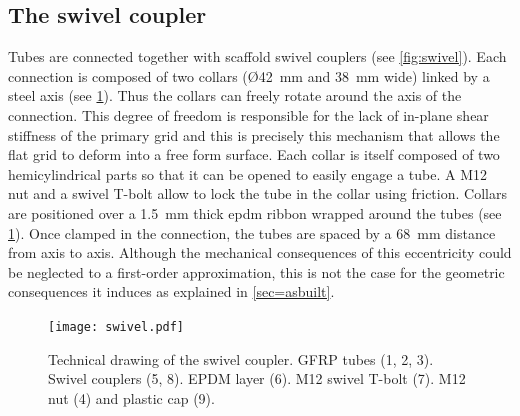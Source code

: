 \subsection{The swivel coupler}\label{sec=swivel}
Tubes are connected together with scaffold swivel couplers (see \cref{fig:swivel}). Each connection is composed of two collars (\O\;\SI{42}{\mm} and \SI{38}{\mm} wide) linked by a steel axis (see \cref{fig:swivel_dwg}). Thus the collars can freely rotate around the axis of the connection. This degree of freedom is responsible for the lack of in-plane shear stiffness of the primary grid and this is precisely this mechanism that allows the flat grid to deform into a free form surface. Each collar is itself composed of two hemicylindrical parts so that it can be opened to easily engage a tube. A M12 nut and a swivel T-bolt allow to lock the tube in the collar using friction. Collars are positioned over a \SI{1.5}{\mm} thick epdm ribbon wrapped around the tubes (see \cref{fig:swivel_dwg}). Once clamped in the connection, the tubes are spaced by a \SI{68}{\mm} distance from axis to axis. Although the mechanical consequences of this eccentricity could be neglected to a first-order approximation, this is not the case for the geometric consequences it induces as explained in \cref{sec=asbuilt}.

\begin{figure}[t]
	\centering
	\texttt{[image: swivel.pdf]}
	\caption[Technical drawing of the swivel coupler]{Technical drawing of the swivel coupler. GFRP tubes (1, 2, 3). Swivel couplers (5, 8). EPDM layer (6). M12 swivel T-bolt (7). M12 nut (4) and plastic cap (9).}
	\label{fig:swivel_dwg}
\end{figure}

